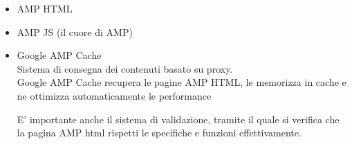 \documentclass{article}
\begin{document}
\begin{itemize}
    \item AMP HTML
    \item AMP JS (il cuore di AMP)
    \item Google AMP Cache\\
    Sistema di consegna dei contenuti basato su proxy.\\
    Google AMP Cache recupera le pagine AMP HTML, le memorizza in cache e ne ottimizza automaticamente le performance
    
    E' importante anche il sistema di validazione, tramite il quale si verifica che la pagina AMP html rispetti le specifiche e funzioni effettivamente.
    

\end{itemize}




\end{document}
